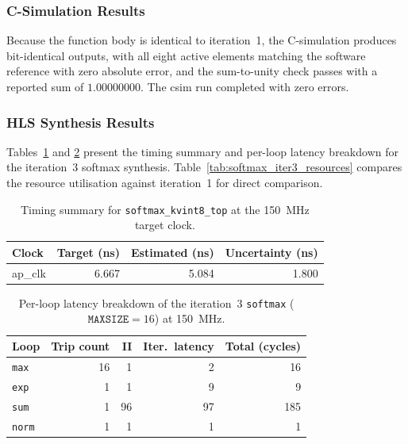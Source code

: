 \subsubsection{C-Simulation Results}
\label{subsubsec:softmax_iter3_csim}

Because the function body is identical to iteration~1, the C-simulation
produces bit-identical outputs, with all eight active elements matching the
software reference with zero absolute error, and the sum-to-unity check
passes with a reported sum of $1.00000000$. The csim run
completed with zero errors.

\subsubsection{HLS Synthesis Results}
\label{subsubsec:softmax_iter3_csyn}

Tables~\ref{tab:softmax_iter3_timing} and \ref{tab:softmax_iter3_latency}
present the timing summary and per-loop latency breakdown for the
iteration~3 softmax synthesis. Table~\ref{tab:softmax_iter3_resources}
compares the resource utilisation against iteration~1 for direct comparison.

\begin{table}[H]
  \centering
  \begin{tabular}{lrrr}
    \toprule
    Clock   & Target (ns) & Estimated (ns) & Uncertainty (ns) \\
    \midrule
    ap\_clk & 6.667       & 5.084          & 1.800 \\
    \bottomrule
  \end{tabular}
  \caption{Timing summary for \texttt{softmax\_kvint8\_top} at the
           \SI{150}{\mega\hertz} target clock.}
  \label{tab:softmax_iter3_timing}
\end{table}

\begin{table}[H]
  \centering
  \begin{tabular}{lrrrr}
    \toprule
    Loop & Trip count & II & Iter.\ latency & Total (cycles) \\
    \midrule
    \texttt{max}  & 16 &  1 &  2 &  16 \\
    \texttt{exp}  &  1 &  1 &  9 &   9 \\
    \texttt{sum}  &  1 & 96 & 97 & 185 \\
    \texttt{norm} &  1 &  1 &  1 &   1 \\
    \bottomrule
  \end{tabular}
  \caption{Per-loop latency breakdown of the iteration~3 \texttt{softmax}
           ($\texttt{MAXSIZE} = 16$) at \SI{150}{\mega\hertz}.}
  \label{tab:softmax_iter3_latency}
\end{table}

